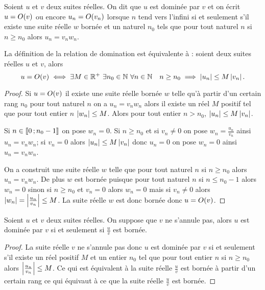 \begin{defdef}
  Soient $u$ et $v$ deux suites réelles. On dit que $u$ est dominée par $v$ et on écrit $u=O\mathopen{}\left(v\right)$ ou encore $u_n=O\mathopen{}\left(v_n\right)$ lorsque $n$ tend vers l'infini si et seulement s'il existe une suite réelle $w$ bornée et un naturel $n_0$ tels que pour tout naturel $n$ si $n \geq n_0$ alors $u_n = v_n w_n$. 
\end{defdef}
\begin{prop}
  La définition de la relation de domination est équivalente à : soient deux suites réelles $u$ et $v$, alors
  \begin{equation}
    u=O\mathopen{}\left(v\right) \iff \exists M \in \mathbb{R}^{+} \ \exists n_0 \in \mathbb{N} \ \forall n \in \mathbb{N} \quad n \geq n_0 \implies \left\lvert u_n\right\rvert \leq M \left\lvert v_n\right\rvert.
  \end{equation}
\end{prop}
\begin{proof}
  Si $u=O\mathopen{}\left(v\right)$ il existe une suite réelle bornée $w$ telle qu'à partir d'un certain rang $n_0$ pour tout naturel $n$ on a $u_n=v_n w_n$ alors il existe un réel $M$ positif tel que pour tout entier $n$ $\left\lvert w_n\right\rvert \leq M$. Alors pour tout entier $n > n_0$, $\left\lvert u_n\right\rvert\leq M \left\lvert v_n\right\rvert$.

Si $n \in \mathopen{\llbracket}0\mathclose{}\mathpunct{};n_0-1\mathclose{\rrbracket}$ on pose $w_n=0$. Si $n \geq n_0$ et si $v_n \neq 0$ on pose $w_n = \frac{u_n}{v_n}$ ainsi $u_n = v_n w_n$; si $v_n = 0$ alors $\left\lvert u_n\right\rvert \leq M \left\lvert v_n\right\rvert$ donc $u_n=0$ on pose $w_n=0$ ainsi $u_n=v_n w_n$.

On a construit une suite réelle $w$ telle que pour tout naturel $n$ si $n \geq n_0$ alors $u_n = v_n w_n$. De plus $w$ est bornée puisque pour tout naturel $n$ si $n \leq n_0 -1$ alors $w_n=0$ sinon si $n \geq n_0$ et $v_n=0$ alors $w_n=0$ mais si $v_n \neq 0$ alors $\left\lvert w_n\right\rvert=\left\lvert\frac{u_n}{v_n}\right\rvert \leq M$. La suite réelle $w$ est donc bornée donc $u=O\mathopen{}\left(v\right)$.
\end{proof}
\begin{prop}
  Soient $u$ et $v$ deux suites réelles. On suppose que $v$ ne s'annule pas, alors $u$ est dominée par $v$ si et seulement si $\frac{u}{v}$ est bornée.
\end{prop}
\begin{proof}
  La suite réelle $v$ ne s'annule pas donc $u$ est dominée par $v$ si et seulement s'il existe un réel positif $M$ et un entier $n_0$ tel que pour tout entier $n$ si $n \geq n_0$ alors $\left\lvert\frac{u_n}{v_n}\right\rvert \leq M$. Ce qui est équivalent à la suite réelle $\frac{u}{v}$ est bornée à partir d'un certain rang ce qui équivaut à  ce que la suite réelle $\frac{u}{v}$ est bornée.
\end{proof}


